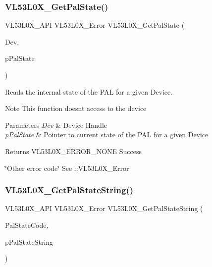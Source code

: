 \subsubsection{\texorpdfstring{V\+L53\+L0\+X\+\_\+\+Get\+Pal\+State()}{VL53L0X\_GetPalState()}}
{\footnotesize\ttfamily V\+L53\+L0\+X\+\_\+\+A\+PI V\+L53\+L0\+X\+\_\+\+Error V\+L53\+L0\+X\+\_\+\+Get\+Pal\+State (\begin{DoxyParamCaption}\item[{\hyperlink{group__VL53L0X__platform__group_ga2d6405308b1dd524b462f1b8fb97d167}{V\+L53\+L0\+X\+\_\+\+D\+EV}}]{Dev,  }\item[{V\+L53\+L0\+X\+\_\+\+State $\ast$}]{p\+Pal\+State }\end{DoxyParamCaption})}



Reads the internal state of the P\+AL for a given Device. 

\begin{DoxyNote}{Note}
This function doesn\textquotesingle{}t access to the device
\end{DoxyNote}

\begin{DoxyParams}{Parameters}
{\em Dev} & Device Handle \\
\hline
{\em p\+Pal\+State} & Pointer to current state of the P\+AL for a given Device \\
\hline
\end{DoxyParams}
\begin{DoxyReturn}{Returns}
V\+L53\+L0\+X\+\_\+\+E\+R\+R\+O\+R\+\_\+\+N\+O\+NE Success 

\char`\"{}\+Other error code\char`\"{} See \+::\+V\+L53\+L0\+X\+\_\+\+Error 
\end{DoxyReturn}
\mbox{\label{group__VL53L0X__general__group_ga1897c54c56a85fab54012ea53a444b23}} 
\subsubsection{\texorpdfstring{V\+L53\+L0\+X\+\_\+\+Get\+Pal\+State\+String()}{VL53L0X\_GetPalStateString()}}
{\footnotesize\ttfamily V\+L53\+L0\+X\+\_\+\+A\+PI V\+L53\+L0\+X\+\_\+\+Error V\+L53\+L0\+X\+\_\+\+Get\+Pal\+State\+String (\begin{DoxyParamCaption}\item[{V\+L53\+L0\+X\+\_\+\+State}]{Pal\+State\+Code,  }\item[{char $\ast$}]{p\+Pal\+State\+String }\end{DoxyParamCaption})}



